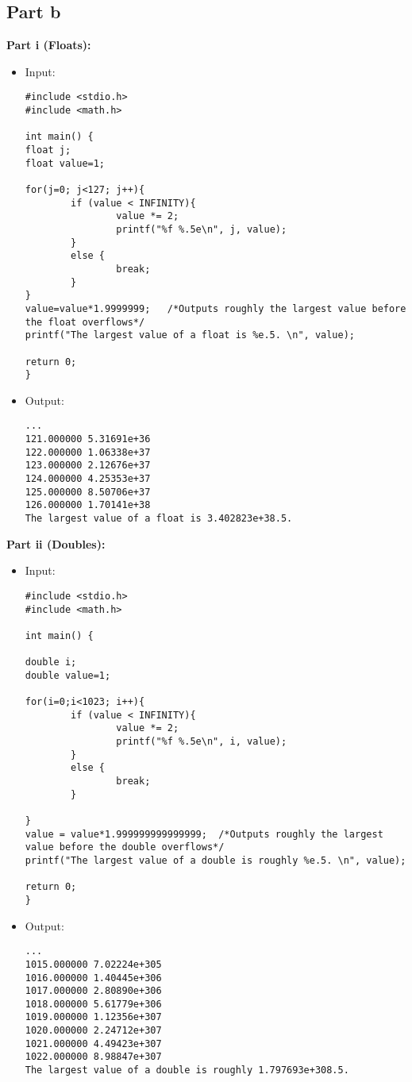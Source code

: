 \documentclass[10pt]{article}
\begin{document}
\subsection{Part b}
\textbf{Part i (Floats):}
\begin{itemize}
\item Input:
\begin{verbatim}
#include <stdio.h>
#include <math.h>

int main() {
float j;
float value=1;

for(j=0; j<127; j++){
        if (value < INFINITY){
                value *= 2;
                printf("%f %.5e\n", j, value);
        }
        else {
                break;
        }
}
value=value*1.9999999;   /*Outputs roughly the largest value before the float overflows*/
printf("The largest value of a float is %e.5. \n", value);

return 0;
}
\end{verbatim}

\item Output:
\begin{verbatim}
...
121.000000 5.31691e+36
122.000000 1.06338e+37
123.000000 2.12676e+37
124.000000 4.25353e+37
125.000000 8.50706e+37
126.000000 1.70141e+38
The largest value of a float is 3.402823e+38.5. 
\end{verbatim}
\end{itemize}
\textbf{Part ii (Doubles):}
\begin{itemize}
\item Input:
\begin{verbatim}
#include <stdio.h>
#include <math.h>

int main() {

double i;
double value=1;

for(i=0;i<1023; i++){
        if (value < INFINITY){
                value *= 2;
                printf("%f %.5e\n", i, value);
        }
        else {
                break;
        }

}
value = value*1.999999999999999;  /*Outputs roughly the largest value before the double overflows*/
printf("The largest value of a double is roughly %e.5. \n", value);

return 0;
}
\end{verbatim}
\item Output:
\begin{verbatim}
...
1015.000000 7.02224e+305
1016.000000 1.40445e+306
1017.000000 2.80890e+306
1018.000000 5.61779e+306
1019.000000 1.12356e+307
1020.000000 2.24712e+307
1021.000000 4.49423e+307
1022.000000 8.98847e+307
The largest value of a double is roughly 1.797693e+308.5. 
\end{verbatim}
\end{itemize}
\end{document}
